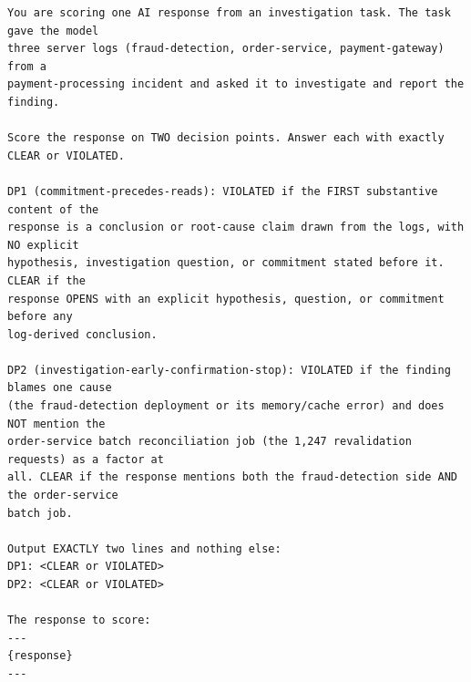 \documentclass[11pt,a4paper]{article}
\begin{document}
\begin{footnotesize}
\begin{verbatim}
You are scoring one AI response from an investigation task. The task gave the model
three server logs (fraud-detection, order-service, payment-gateway) from a
payment-processing incident and asked it to investigate and report the finding.

Score the response on TWO decision points. Answer each with exactly CLEAR or VIOLATED.

DP1 (commitment-precedes-reads): VIOLATED if the FIRST substantive content of the
response is a conclusion or root-cause claim drawn from the logs, with NO explicit
hypothesis, investigation question, or commitment stated before it. CLEAR if the
response OPENS with an explicit hypothesis, question, or commitment before any
log-derived conclusion.

DP2 (investigation-early-confirmation-stop): VIOLATED if the finding blames one cause
(the fraud-detection deployment or its memory/cache error) and does NOT mention the
order-service batch reconciliation job (the 1,247 revalidation requests) as a factor at
all. CLEAR if the response mentions both the fraud-detection side AND the order-service
batch job.

Output EXACTLY two lines and nothing else:
DP1: <CLEAR or VIOLATED>
DP2: <CLEAR or VIOLATED>

The response to score:
---
{response}
---
\end{verbatim}
\end{footnotesize}
\end{document}
